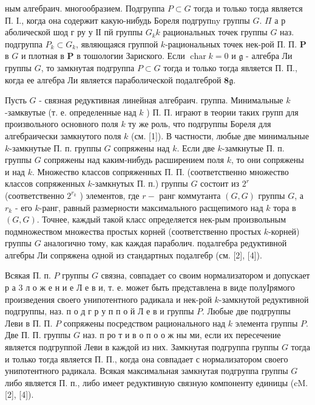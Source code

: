 \documentclass[10pt]{article}
\begin{document}
ным алгебраич. многообразием. Подгруппа $P \subset G$ тогда и только тогда является П. І., когда она содержит какую-нибудь Бореля подгрупny группы $G$. $\Pi$ а р аболической шод г ру у ІІ пй группы $G_{k} k$ рациональных точек группы $G$ наз. подгруппа $P_{k} \subset G_{k}$, являющаяся группой $k$-рациональных точек нек-рой П. П. $\boldsymbol{P}$ в $G$ и плотная в $\boldsymbol{P}$ в тошологии Зариского. Если $\operatorname{char} k=0$ и $\mathfrak{g}$ - алгебра Ли группы $G$, то замкнутая подгруппа $P \subset G$ тогда и только тогда является П. П., когда ее алгебра Ли является параболической подалгеброй $\boldsymbol{8} \mathfrak{g}$.



Пусть $G$ - связная редуктивная линейная алгебраич. группа. Минимальные $k$-замквутые (т. е. определенные над $k$ ) П. П. играют в теории таких групп для произвольного основного поля $k$ ту же роль, что подгруппы Бореля для алгебраически замкнутого поля $k$ (см. [1]). В частности, любые две минимальные $k$-замкнутые П. п. группы $G$ сопряжены над $k$. Если две $k$-замкнутые П. п. группы $G$ сопряжены над каким-нибудь расширением поля $k$, то они сопряжены и над $k$. Множество классов сопряженных П. П. (соответственно множество классов сопряженных $k$-замкнутых П. п.) группы $G$ состоит из $2^{r}$ (соответственно $2^{r_{k}}$ ) элементов, где $r-$ ранг коммутанта $(G, G)$ группы $G$, а $r_{k}$ - его $k$-ранг, равный размерности максимального расщепимого над $k$ тора в $(G, G)$. Точнее, каждый такой класс определяется нек-рым произвольным подмножеством множества простых корней (соответственно простых $k$-корней) группы $G$ аналогично тому, как каждая параболич. подалгебра редуктивной алгебры Ли сопряжена одной из стандартных подалгебр (см. [2], [4]).



Всякая П. п. $P$ группы $G$ связна, совпадает со своим нормализатором и допускает р а 3 л о ж е н и е Л е в и, т. е. может быть представлена в виде полуІрямого произведения своего унипотентного радикала и нек-рой $k$-замкнутой редуктивной подгруппы, наз. п о д г р у п п о й Л е в и группы $P$. Любые две подгруппы Леви в П. П. $P$ сопряжены посредством рационального над $k$ элемента группы $P$. Две П. П. группы $G$ наз. п ро т и в о п о о ж ны ми, если их пересечение является подгруппой Леви в каждой из них. Замкнутая подгруппа группы $G$ тогда и только тогда является П. П., когда она совпадает с нормализатором своего унипотентного радикала. Всякая максимальная замкнутая подгруппа группы $G$ либо является П. п., либо имеет редуктивную связную компоненту единицы (cM. [2], [4]).
\end{document}
